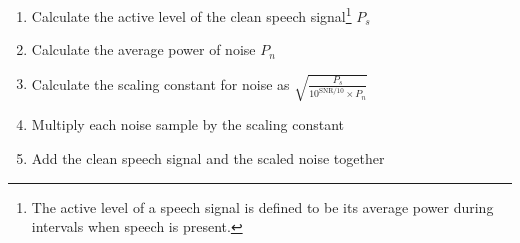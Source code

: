 \begin{enumerate}
\item Calculate the active level of the clean speech signal\footnote{The active level of a speech signal is defined to be its average power during intervals when speech is present.} $P_s$
\item Calculate the average power of noise $P_n$
\item Calculate the scaling constant for noise as $\sqrt{\frac{P_s}{10^{\text{SNR}/10} \times P_n}}$
\item Multiply each noise sample by the scaling constant
\item Add the clean speech signal and the scaled noise together
\end{enumerate}